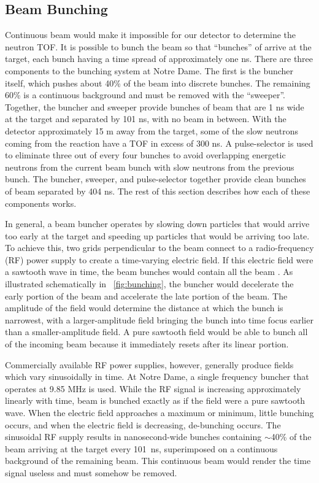 \subsection{Beam Bunching}

Continuous beam would make it impossible for our detector to determine the neutron TOF.  It is possible to bunch the beam so that ``bunches'' of  arrive at the target, each bunch having a time spread of approximately one ns. There are three components to the bunching system at Notre Dame.  The first is the buncher itself, which pushes about 40\% of the beam into discrete bunches.  The remaining 60\% is a continuous background and must be removed with the ``sweeper''.  Together, the buncher and sweeper provide bunches of beam that are 1 ns wide at the target and separated by 101 ns, with no beam in between.  With the detector approximately 15 m away from the target, some of the slow neutrons coming from the reaction have a TOF in excess of 300 ns.  A pulse-selector is used to eliminate three out of every four bunches to avoid overlapping energetic neutrons from the current beam bunch with slow neutrons from the previous bunch.  The buncher, sweeper, and pulse-selector together provide clean bunches of beam separated by 404 ns.  The rest of this section describes how each of these components works.

In general, a beam buncher operates by slowing down particles that would arrive too early at the target and speeding up particles that would be arriving too late.  To achieve this, two grids perpendicular to the beam connect to a radio-frequency (RF) power supply to create a time-varying electric field.  If this electric field were a sawtooth wave in time, the beam bunches would contain all the beam \citep{LynchBunching}.  As illustrated schematically in {\fig}~\ref{fig:bunching}, the buncher would decelerate the early portion of the beam and accelerate the late portion of the beam.  The amplitude of the field would determine the distance at which the bunch is narrowest, with a larger-amplitude field bringing the bunch into time focus earlier than a smaller-amplitude field.  A pure sawtooth field would be able to bunch all of the incoming beam because it immediately resets after its linear portion.  

Commercially available RF power supplies, however, generally produce fields which vary sinusoidally in time.  At Notre Dame, a single frequency buncher that operates at 9.85 MHz is used.  While the RF signal is increasing approximately linearly with time, beam is bunched exactly as if the field were a pure sawtooth wave.  When the electric field approaches a maximum or minimum, little bunching occurs, and when the electric field is decreasing, de-bunching occurs.  The sinusoidal RF supply results in nanosecond-wide bunches containing $\sim$40\% of the beam arriving at the target every 101~ns, superimposed on a continuous background of the remaining beam.  This continuous beam would render the time signal useless and must somehow be removed.

